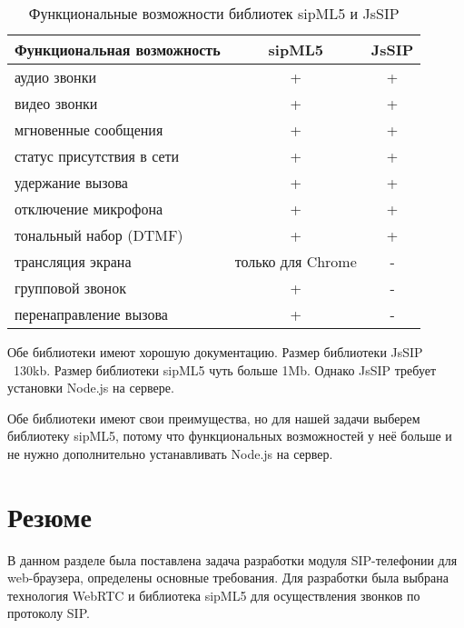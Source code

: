 \begin{table}
	\caption{Функциональные возможности библиотек sipML5 и JsSIP}
	\begin{center}
	\begin{tabular}{|l|c|c|}
	\hline 
	\textbf{Функциональная возможность} & \textbf{sipML5} & \textbf{JsSIP}	\\ 
	\hline 
	аудио звонки & + & + \\ 
	\hline 
	видео звонки & + & + \\ 
	\hline 
	мгновенные сообщения & + & + \\ 
	\hline 
	статус присутствия в сети & + & + \\ 
	\hline 
	удержание вызова & + & + \\ 
	\hline 
	отключение микрофона & + & + \\ 
	\hline 
	тональный набор (DTMF) & + & + \\ 
	\hline 
	трансляция экрана & только для Chrome & - \\ 
	\hline 
	групповой звонок & + & - \\ 
	\hline 
	перенаправление вызова & + & - \\ 
	\hline 
	\end{tabular} 
	\end{center}
	\label{table:sipml5_vs_jssip}
\end{table}

Обе библиотеки имеют хорошую документацию. Размер библиотеки JsSIP ~130kb. Размер библиотеки sipML5 чуть больше 1Mb. Однако JsSIP требует установки Node.js на сервере.

Обе библиотеки имеют свои преимущества, но для нашей задачи выберем библиотеку sipML5, потому что функциональных возможностей у неё больше и не нужно дополнительно устанавливать Node.js на сервер.

\section{Резюме}

В данном разделе была поставлена задача разработки модуля SIP-телефонии для web-браузера, определены основные требования. Для разработки была выбрана технология WebRTC и библиотека sipML5 для осуществления звонков по протоколу SIP.
